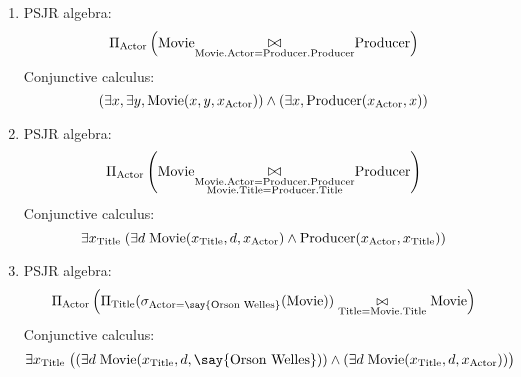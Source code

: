 \documentclass{../../cs-classes/cs-classes}
\newcommand*{\titl}{\textnormal{Title}}
\newcommand*{\movie}{\textnormal{Movie}}
\newcommand*{\actor}{\textnormal{Actor}}
\newcommand*{\producer}{\textnormal{Producer}}
\newcommand{\constant}[1]{\textnormal{\say{#1}}}
\begin{document}
\begin{exercise}
\begin{enumerate}
        \item PSJR algebra:
        \begin{equation*}
            \Pi_{\actor}\left(\movie\underset{\movie.\actor=\producer.\producer}{\mathlarger\bowtie}\producer\right)
        \end{equation*}
        Conjunctive calculus:
        \begin{equation*}
            (\exists x, \exists y, \movie(x, y, x_{\actor})) \land (\exists x, \producer(x_{\actor}, x))
        \end{equation*}

        \item PSJR algebra:
        \begin{equation*}
            \Pi_{\actor}\left(\movie\underset{\substack{\movie.\actor=\producer.\producer\\\movie.\titl=\producer.\titl}}{\mathlarger\bowtie}\producer\right)
        \end{equation*}
        Conjunctive calculus:
        \begin{equation*}
            \exists x_{\titl} \; (\exists d \; \movie(x_{\titl}, d, x_{\actor}) \land \producer(x_{\actor}, x_{\titl}))
        \end{equation*}

        \item PSJR algebra:
        \begin{equation*}
           \Pi_{\actor}\left(\Pi_{\titl}(\sigma_{\actor=\constant{Orson Welles}}(\movie))\underset{\titl=\movie.\titl}{\bowtie}\movie\right)
        \end{equation*}
        Conjunctive calculus:
        \begin{equation*}
            \exists x_{\titl}\; \big((\exists d \; \movie(x_{\titl}, d, \constant{Orson Welles})) \land (\exists d \; \movie(x_{\titl}, d, x_{\actor}))\big)
        \end{equation*}


\end{enumerate}
\end{exercise}
\end{document}
